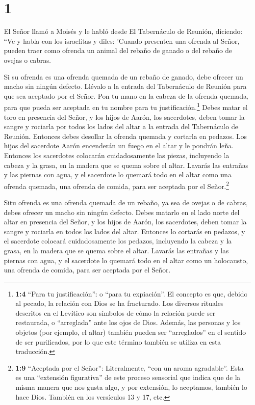 \hypertarget{section}{%
\section{1}\label{section}}

 El Señor llamó a Moisés y le habló desde El Tabernáculo de
Reunión, diciendo:  ``Ve y habla con los israelitas y diles:
'Cuando presenten una ofrenda al Señor, pueden traer como ofrenda un
animal del rebaño de ganado o del rebaño de ovejas o cabras.

 Si su ofrenda es una ofrenda quemada de un rebaño de
ganado, debe ofrecer un macho sin ningún defecto. Llévalo a la entrada
del Tabernáculo de Reunión para que sea aceptado por el Señor.
 Pon tu mano en la cabeza de la ofrenda quemada, para que
pueda ser aceptada en tu nombre para tu justificación.\footnote{\textbf{1:4}
  ``Para tu justificación'': o ``para tu expiación''. El concepto es
  que, debido al pecado, la relación con Dios se ha fracturado. Los
  diversos rituales descritos en el Levítico son símbolos de cómo la
  relación puede ser restaurada, o ``arreglada'' ante los ojos de Dios.
  Además, las personas y los objetos (por ejemplo, el altar) también
  pueden ser ``arreglados'' en el sentido de ser purificados, por lo que
  este término también se utiliza en esta traducción.} 
Debes matar el toro en presencia del Señor, y los hijos de Aarón, los
sacerdotes, deben tomar la sangre y rociarla por todos los lados del
altar a la entrada del Tabernáculo de Reunión.  Entonces
debes desollar la ofrenda quemada y cortarla en pedazos. 
Los hijos del sacerdote Aarón encenderán un fuego en el altar y le
pondrán leña.  Entonces los sacerdotes colocarán
cuidadosamente las piezas, incluyendo la cabeza y la grasa, en la madera
que se quema sobre el altar.  Lavarás las entrañas y las
piernas con agua, y el sacerdote lo quemará todo en el altar como una
ofrenda quemada, una ofrenda de comida, para ser aceptada por el
Señor.\footnote{\textbf{1:9} ``Aceptada por el Señor'': Literalmente,
  ``con un aroma agradable''. Esta es una ``extensión figurativa'' de
  este proceso sensorial que indica que de la misma manera que nos gusta
  algo, y por extensión, lo aceptamos, también lo hace Dios. También en
  los versículos 13 y 17, etc.}

 Situ ofrenda es una ofrenda quemada de un rebaño, ya sea
de ovejas o de cabras, debes ofrecer un macho sin ningún defecto.
 Debes matarlo en el lado norte del altar en presencia del
Señor, y los hijos de Aarón, los sacerdotes, deben tomar la sangre y
rociarla en todos los lados del altar.  Entonces lo
cortarás en pedazos, y el sacerdote colocará cuidadosamente los pedazos,
incluyendo la cabeza y la grasa, en la madera que se quema sobre el
altar.  Lavarás las entrañas y las piernas con agua, y el
sacerdote lo quemará todo en el altar como un holocausto, una ofrenda de
comida, para ser aceptada por el Señor.

